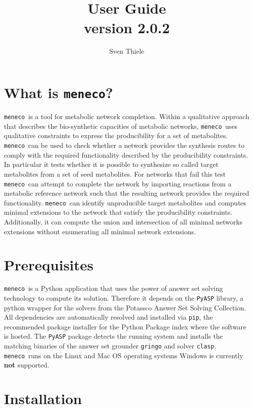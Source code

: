 \documentclass{article}
\title{ \meneco  \\
User Guide \\
version 2.0.2
}
\author{Sven Thiele}
\date{}
\newcommand\meneco{\texttt{meneco}}
\begin{document}
\maketitle

\section{What is \meneco?}

\meneco\ is a tool for metabolic network completion.
Within a qualitative approach that describes the bio-synthetic capacities of metabolic networks,
 \meneco\ uses qualitative constraints to express the producibility for a set of metabolites.
\meneco\ can be used to check whether a network provides the synthesis routes to comply
 with the required functionality described by the producibility constraints.
In particular it tests whether it is possible to synthesize so called target metabolites from a set of seed metabolites.
For networks that fail this test \meneco\ can attempt to complete the network by importing reactions
from a metabolic reference network such that the resulting network provides the required functionality.
\meneco\ can identify unproducible target metabolites and computes minimal extensions to the network that satisfy the producibility constraints.
Additionally, it can compute the union and intersection of all minimal networks extensions without enumerating all minimal network extensions.


\section{Prerequisites}
\meneco\ is a Python application that uses the power of answer set solving technology to compute its solution.
Therefore it depends on the \texttt{PyASP} library, a python wrapper for the solvers from the Potassco Answer Set Solving Collection.
All dependencies are automatically resolved and installed via \texttt{pip}, the recommended package installer for the Python Package index where the software is hosted.
The \texttt{PyASP} package detects the running system and installs the matching binaries of the answer set grounder \texttt{gringo} and solver \texttt{clasp}.
\meneco\ runs on the Linux and Mac OS operating systems Windows is currently {\bf not} supported.


\section{Installation}
\end{document}
